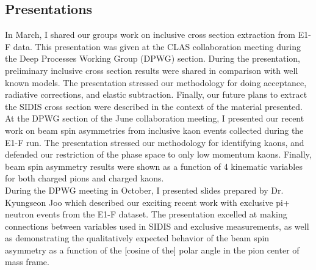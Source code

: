 \subsection{Presentations}
In March, I shared our groups work on inclusive cross section extraction from E1-F data.  This presentation was given at the CLAS collaboration meeting during the Deep Processes Working Group (DPWG) section.  During the presentation, preliminary inclusive cross section results were shared in comparison with well known models.  The presentation stressed our methodology for doing acceptance, radiative corrections, and elastic subtraction.  Finally, our future plans to extract the SIDIS cross section were described in the context of the material presented.\\
At the DPWG section of the June collaboration meeting, I presented our recent work on beam spin asymmetries from inclusive kaon events collected during the E1-F run.  The presentation stressed our methodology for identifying kaons, and defended our restriction of the phase space to only low momentum kaons.  Finally, beam spin asymmetry results were shown as a function of 4 kinematic variables for both charged pions and charged kaons.  \\
During the DPWG meeting in October, I presented slides prepared by Dr. Kyungseon Joo which described our exciting recent work with exclusive pi+ neutron events from the E1-F dataset.  The presentation excelled at making connections between variables used in SIDIS and exclusive measurements, as well as demonstrating the qualitatively expected behavior of the beam spin asymmetry as a function of the [cosine of the] polar angle in the pion center of mass frame.  

